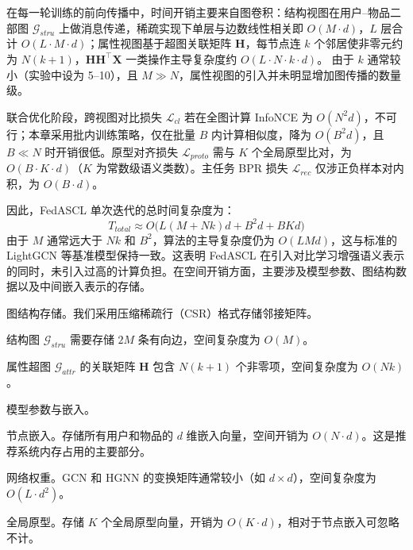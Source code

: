 在每一轮训练的前向传播中，时间开销主要来自图卷积：结构视图在用户–物品二部图 $\mathcal{G}_{stru}$ 上做消息传递，稀疏实现下单层与边数线性相关即 $O(M \cdot d)$，$L$ 层合计 $O(L \cdot M \cdot d)$；属性视图基于超图关联矩阵 $\mathbf{H}$，每节点连 $k$ 个邻居使非零元约为 $N(k+1)$，$\mathbf{H}\mathbf{H}^\top \mathbf{X}$ 一类操作主导复杂度约 $O(L \cdot N \cdot k \cdot d)$。
由于 $k$ 通常较小（实验中设为 5--10），且 $M \gg N$，属性视图的引入并未明显增加图传播的数量级。

联合优化阶段，跨视图对比损失 $\mathcal{L}_{cl}$ 若在全图计算 InfoNCE 为 $O(N^2 d)$，不可行；本章采用批内训练策略，仅在批量 $B$ 内计算相似度，降为 $O(B^2 d)$，且 $B \ll N$ 时开销很低。原型对齐损失 $\mathcal{L}_{proto}$ 需与 $K$ 个全局原型比对，为 $O(B \cdot K \cdot d)$（$K$ 为常数级语义类数）。主任务 BPR 损失 $\mathcal{L}_{rec}$ 仅涉正负样本对内积，为 $O(B \cdot d)$。

因此，FedASCL 单次迭代的总时间复杂度为：
\begin{equation}
    T_{total} \approx O\Big( L(M + Nk)d + B^2d + BKd \Big)
\end{equation}
由于 $M$ 通常远大于 $Nk$ 和 $B^2$，算法的主导复杂度仍为 $O(LMd)$，这与标准的 LightGCN 等基准模型保持一致\cite{he2020lightgcn}。这表明 FedASCL 在引入对比学习增强语义表示的同时，未引入过高的计算负担。在空间开销方面，主要涉及模型参数、图结构数据以及中间嵌入表示的存储。

\begin{cnenumerate}
    \cnitem 图结构存储。我们采用压缩稀疏行（CSR）格式存储邻接矩阵。
    \begin{subenumerate}
        \item 结构图 $\mathcal{G}_{stru}$ 需要存储 $2M$ 条有向边，空间复杂度为 $O(M)$。
        \item 属性超图 $\mathcal{G}_{attr}$ 的关联矩阵 $\mathbf{H}$ 包含 $N(k+1)$ 个非零项，空间复杂度为 $O(Nk)$。
    \end{subenumerate}
    \cnitem 模型参数与嵌入。
    \begin{subenumerate}
        \item 节点嵌入。存储所有用户和物品的 $d$ 维嵌入向量，空间开销为 $O(N \cdot d)$。这是推荐系统内存占用的主要部分。
        \item 网络权重。GCN 和 HGNN 的变换矩阵通常较小（如 $d \times d$），空间复杂度为 $O(L \cdot d^2)$。
        \item 全局原型。存储 $K$ 个全局原型向量，开销为 $O(K \cdot d)$，相对于节点嵌入可忽略不计。
    \end{subenumerate}
\end{cnenumerate}

